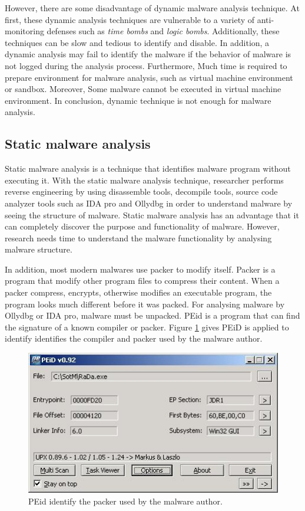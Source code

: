 However, there are some disadvantage of dynamic malware analysis technique. At first, these dynamic analysis techniques are vulnerable to a variety of anti-monitoring defenses such as \emph{time bombs} and \emph{logic bombs}. Additionally, these techniques can be slow and tedious to identify and disable. In addition, a dynamic analysis may fail to identify the malware if the behavior of malware is not logged during the analysis process. Furthermore, Much time is required to prepare environment for malware analysis, such as virtual machine environment or sandbox. Moreover, Some malware cannot be executed in virtual machine environment. In conclusion, dynamic technique is not enough for malware analysis. 

\subsection{Static malware analysis}

Static malware analysis is a technique that identifies malware program without executing it. With the static malware analysis technique, researcher performs reverse engineering by using disassemble tools, decompile tools, source code analyzer tools such as IDA pro and Ollydbg in order to understand malware by seeing the structure of malware. Static malware analysis has an advantage that it can completely discover the purpose and functionality of malware. However, research needs time to understand the malware functionality by analysing malware structure.

In addition, most modern malwares use packer to modify itself. Packer is a program that modify other program files to compress their content. When a packer compress, encrypts, otherwise modifies an executable program, the program looks much different before it was packed. For analysing malware by Ollydbg or IDA pro, malware must be unpacked. PEid is a program that can find the signature of a known compiler or packer. Figure \ref{fig:PEid} gives PEiD is applied to identify identifies the compiler and packer used by the malware author.

\begin{figure}[h!]
\centering
\includegraphics[width=1\textwidth]{graph/PEid.jpg}
\caption{PEid identify the packer used by the malware author.}
\label{fig:PEid}
\end{figure}

